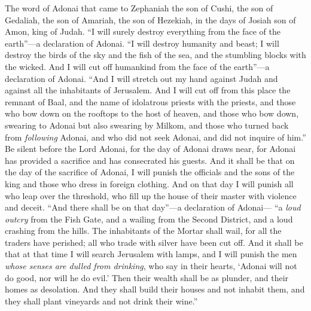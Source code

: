 
\begin{biblechapter} %
 The word of Adonai that came to Zephaniah the son of Cushi, the son of Gedaliah, the son of Amariah, the son of Hezekiah, in the days of Josiah son of Amon, king of Judah.
\verse “I will surely destroy everything 
from the face of the earth”—a declaration of Adonai.
\verse “I will destroy humanity and beast; 
I will destroy the birds of the sky 
and the fish of the sea, 
and the stumbling blocks with the wicked. 
And I will cut off humankind 
from the face of the earth”—a declaration of Adonai.
\verse “And I will stretch out my hand against Judah 
and against all the inhabitants of Jerusalem. 
And I will cut off from this place 
the remnant of Baal, 
and the name of idolatrous priests with the priests,
\verse and those who bow down on the rooftops 
to the host of heaven, 
and those who bow down, swearing to Adonai 
but also swearing by Milkom,
\verse and those who turned back from \textit{following} Adonai, 
and who did not seek Adonai, 
and did not inquire of him.”
\verse Be silent before the Lord Adonai, 
for the day of Adonai draws near, 
for Adonai has provided a sacrifice 
and has consecrated his guests.
\verse And it shall be that on the day of the sacrifice of Adonai, 
I will punish the officials 
and the sons of the king 
and those who dress in foreign clothing.
\verse And on that day I will punish 
all who leap over the threshold, 
who fill up the house of their master 
with violence and deceit.
\verse “And there shall be on that day”—a declaration of Adonai— 
“a \textit{loud outcry} from the Fish Gate, 
and a wailing from the Second District, 
and a loud crashing from the hills.
\verse The inhabitants of the Mortar shall wail, 
for all the traders have perished; 
all who trade with silver have been cut off.
\verse And it shall be that at that time 
I will search Jerusalem with lamps, 
and I will punish the men 
\textit{whose senses are dulled from drinking}, 
who say in their hearts, 
‘Adonai will not do good, nor will he do evil.’
\verse Then their wealth shall be as plunder, 
and their homes as desolation. 
And they shall build their houses and not inhabit them, 
and they shall plant vineyards and not drink their wine.”

\end{biblechapter}
